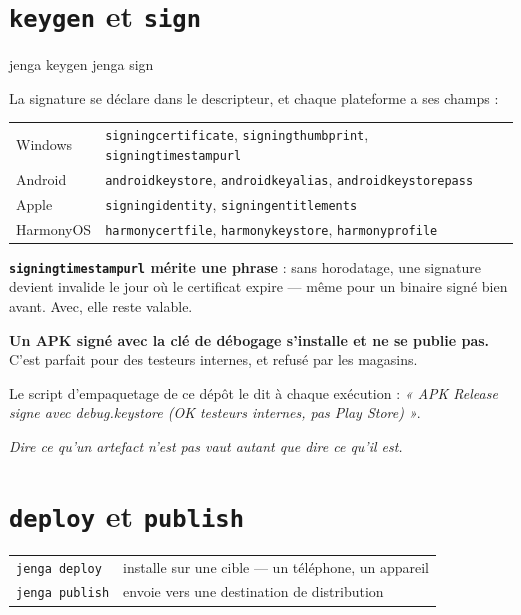 \section{\texttt{keygen} et \texttt{sign}}

\begin{nkcode}{}
jenga keygen
jenga sign
\end{nkcode}

\begin{nkretenir}
La signature se déclare dans le descripteur, et chaque plateforme a ses champs :

\begin{center}
\begin{tabular}{@{}ll@{}}
\toprule
Windows & \texttt{signingcertificate}, \texttt{signingthumbprint}, \texttt{signingtimestampurl} \\
Android & \texttt{androidkeystore}, \texttt{androidkeyalias}, \texttt{androidkeystorepass} \\
Apple & \texttt{signingidentity}, \texttt{signingentitlements} \\
HarmonyOS & \texttt{harmonycertfile}, \texttt{harmonykeystore}, \texttt{harmonyprofile} \\
\bottomrule
\end{tabular}
\end{center}

\textbf{\texttt{signingtimestampurl} mérite une phrase} : sans horodatage, une
signature devient invalide le jour où le certificat expire --- même pour un
binaire signé bien avant. Avec, elle reste valable.
\end{nkretenir}

\begin{nkpiege}
\textbf{Un APK signé avec la clé de débogage s'installe et ne se publie pas.}
C'est parfait pour des testeurs internes, et refusé par les magasins.

Le script d'empaquetage de ce dépôt le dit à chaque exécution :
\emph{« APK Release signe avec debug.keystore (OK testeurs internes, pas Play
Store) »}.

\emph{Dire ce qu'un artefact n'est pas vaut autant que dire ce qu'il est.}
\end{nkpiege}

\section{\texttt{deploy} et \texttt{publish}}

\begin{center}
\begin{tabular}{@{}ll@{}}
\toprule
\texttt{jenga deploy} & installe sur une cible --- un téléphone, un appareil \\
\texttt{jenga publish} & envoie vers une destination de distribution \\
\bottomrule
\end{tabular}
\end{center}

